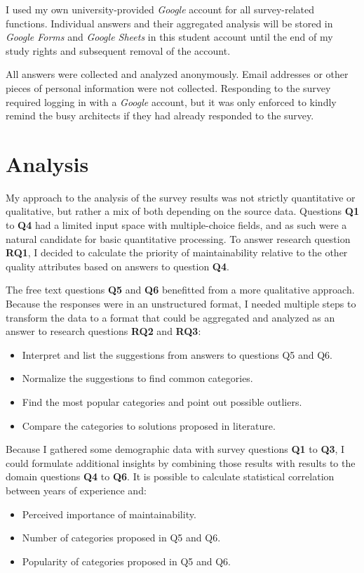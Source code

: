 \documentclass[utf8,english]{gradu3}
\begin{document}
I used my own university-provided \textit{Google} account for all survey-related
functions. Individual answers and their aggregated analysis will be stored in
\textit{Google Forms} and \textit{Google Sheets} in this student account until
the end of my study rights and subsequent removal of the account.

All answers were collected and analyzed anonymously. Email addresses or other
pieces of personal information were not collected. Responding to the survey
required logging in with a \textit{Google} account, but it was only enforced to
kindly remind the busy architects if they had already responded to the survey.


\section{Analysis}

My approach to the analysis of the survey results was not strictly quantitative or qualitative, but rather a mix of both depending on the source data.
Questions \textbf{Q1} to \textbf{Q4} had a limited input space with multiple-choice fields, and as such were a natural candidate for basic quantitative processing.
To answer research question \textbf{RQ1}, I decided to calculate the priority of maintainability relative to the other quality attributes based on answers to question \textbf{Q4}.

The free text questions \textbf{Q5} and \textbf{Q6} benefitted from a more qualitative approach.
Because the responses were in an unstructured format, I needed multiple steps to transform the
data to a format that could be aggregated and analyzed as an answer to
research questions \textbf{RQ2} and \textbf{RQ3}:
\begin{itemize}
  \item Interpret and list the suggestions from answers to questions Q5 and Q6.
  \item Normalize the suggestions to find common categories.
  \item Find the most popular categories and point out possible outliers.
  \item Compare the categories to solutions proposed in literature.
\end{itemize}

Because I gathered some demographic data with survey questions \textbf{Q1} to \textbf{Q3},
I could formulate additional insights by combining those results with results to the domain questions \textbf{Q4} to \textbf{Q6}.
It is possible to calculate statistical correlation between years of experience and:
\begin{itemize}
  \item Perceived importance of maintainability.
  \item Number of categories proposed in Q5 and Q6.
  \item Popularity of categories proposed in Q5 and Q6.
\end{itemize}
\end{document}
